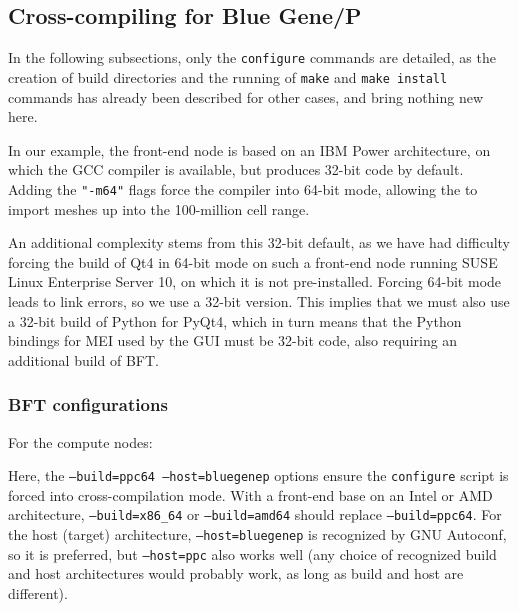 \documentclass[a4paper,10pt,twoside]{article}
\begin{document}
\subsection{Cross-compiling for Blue Gene/P}

In the following subsections, only the \texttt{configure} commands are
detailed, as the creation of build directories and the running of
\texttt{make} and \texttt{make install} commands has already
been described for other cases, and bring nothing new here.

In our example, the front-end node is based on an IBM Power architecture,
on which the GCC compiler is available, but produces 32-bit code by default.
Adding the \texttt{"-m64"} flags force the compiler into 64-bit mode, allowing
the \pcs to import meshes up into the 100-million cell range.

An additional complexity stems from this 32-bit default, as we have
had difficulty forcing the build of Qt4 in 64-bit mode on such
a front-end node running SUSE Linux Enterprise Server 10, on which
it is not pre-installed. Forcing 64-bit mode leads to link errors,
so we use a 32-bit version. This implies that we must also use a
32-bit build of Python for PyQt4, which in turn means that the Python
bindings for MEI used by the GUI must be 32-bit code,
also requiring an additional build of BFT.

\subsubsection{BFT configurations}

For the compute nodes:


Here, the \texttt{--build=ppc64 --host=bluegenep} options ensure the
\texttt{configure} script is forced into cross-compilation mode.
With a front-end base on an Intel or AMD architecture,
\texttt{--build=x86\_64} or \texttt{--build=amd64} should replace
\texttt{--build=ppc64}. For the host (target) architecture,
\texttt{--host=bluegenep} is recognized by GNU Autoconf,
so it is preferred, but \texttt{--host=ppc} also works well
(any choice of recognized build and host architectures would
probably work, as long as build and host are different).
\end{document}
